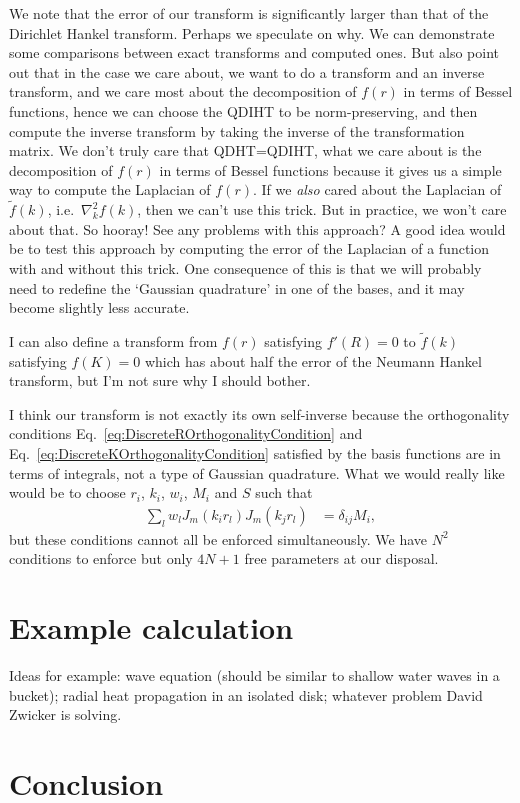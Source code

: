 \documentclass[aip,amsmath,amssymb,reprint,twocolumn]{revtex4-1}
\begin{document}
We note that the error of our transform is significantly larger than that of the Dirichlet Hankel transform.  Perhaps we speculate on why.  We can demonstrate some comparisons between exact transforms and computed ones.  But also point out that in the case we care about, we want to do a transform and an inverse transform, and we care most about the decomposition of $f(r)$ in terms of Bessel functions, hence we can choose the QDIHT to be norm-preserving, and then compute the inverse transform by taking the inverse of the transformation matrix.  We don't truly care that QDHT=QDIHT, what we care about is the decomposition of $f(r)$ in terms of Bessel functions because it gives us a simple way to compute the Laplacian of $f(r)$.  If we \emph{also} cared about the Laplacian of $\tilde{f}(k)$, i.e.\ $\nabla_k^2 f(k)$, then we can't use this trick.  But in practice, we won't care about that. So hooray!  See any problems with this approach?  A good idea would be to test this approach by computing the error of the Laplacian of a function with and without this trick.  One consequence of this is that we will probably need to redefine the `Gaussian quadrature' in one of the bases, and it may become slightly less accurate.

I can also define a transform from $f(r)$ satisfying $f'(R)=0$ to $\tilde{f}(k)$ satisfying $f(K)=0$ which has about half the error of the Neumann Hankel transform, but I'm not sure why I should bother.

I think our transform is not exactly its own self-inverse because the orthogonality conditions Eq.~\eqref{eq:DiscreteROrthogonalityCondition} and Eq.~\eqref{eq:DiscreteKOrthogonalityCondition} satisfied by the basis functions are in terms of integrals, not a type of Gaussian quadrature.  What we would really like would be to choose $r_i$, $k_i$, $w_i$, $M_i$ and $S$ such that
\begin{align}
  \sum_l w_l J_m(k_i r_l) J_m(k_j r_l) &= \delta_{ij} M_i,
\end{align}
but these conditions cannot all be enforced simultaneously.  We have $N^2$ conditions to enforce but only $4N+1$ free parameters at our disposal.

\section{Example calculation}
\label{sec:Example}
Ideas for example: wave equation (should be similar to shallow water waves in a bucket); radial heat propagation in an isolated disk; whatever problem David Zwicker is solving.

\section{Conclusion}
\label{sec:Conclusion}




\end{document}

